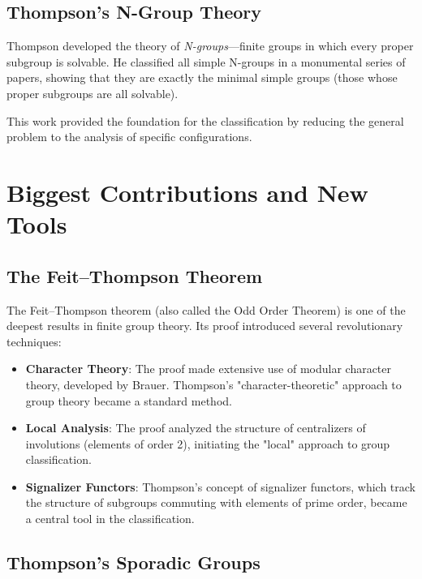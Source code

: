\subsection{Thompson's N-Group Theory}

Thompson developed the theory of \emph{N-groups}---finite groups in which every proper subgroup is solvable. He classified all simple N-groups in a monumental series of papers, showing that they are exactly the minimal simple groups (those whose proper subgroups are all solvable).

This work provided the foundation for the classification by reducing the general problem to the analysis of specific configurations.

\section{Biggest Contributions and New Tools}

\subsection{The Feit--Thompson Theorem}

The Feit--Thompson theorem (also called the Odd Order Theorem) is one of the deepest results in finite group theory. Its proof introduced several revolutionary techniques:

\begin{itemize}
\item \textbf{Character Theory}: The proof made extensive use of modular character theory, developed by Brauer. Thompson's "character-theoretic" approach to group theory became a standard method.

\item \textbf{Local Analysis}: The proof analyzed the structure of centralizers of involutions (elements of order 2), initiating the "local" approach to group classification.

\item \textbf{Signalizer Functors}: Thompson's concept of signalizer functors, which track the structure of subgroups commuting with elements of prime order, became a central tool in the classification.
\end{itemize}

\subsection{Thompson's Sporadic Groups}

